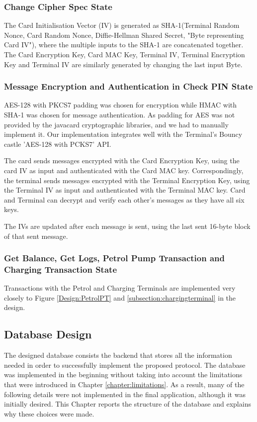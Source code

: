 \documentclass[a4paper,10pt]{llncs}
\begin{document}
\subsubsection{Change Cipher Spec State}
The Card Initialisation Vector (IV) is generated as SHA-1(Terminal Random Nonce, Card Random Nonce, Diffie-Hellman Shared Secret, "Byte representing Card IV"), where the multiple inputs to the SHA-1 are concatenated together. The Card Encryption Key, Card MAC Key, Terminal IV, Terminal Encryption Key and Terminal IV are similarly generated by changing the last input Byte.

\subsubsection{Message Encryption and Authentication in Check PIN State}
AES-128 with PKCS7 padding was chosen for encryption while HMAC with SHA-1 was chosen for message authentication. As padding for AES was not provided by the javacard cryptographic libraries, and we had to manually implement it. Our implementation integrates well with the Terminal's Bouncy castle 'AES-128 with PCKS7' API.

The card sends messages encrypted with the Card Encryption Key, using the card IV as input and authenticated with the Card MAC key. Correspondingly, the terminal sends messages encrypted with the Terminal Encryption Key, using the Terminal IV as input and authenticated with the Terminal MAC key. Card and Terminal can decrypt and verify each other's messages as they have all six keys.

The IVs are updated after each message is sent, using the last sent 16-byte block of that sent message.

\subsubsection{Get Balance, Get Logs, Petrol Pump Transaction and Charging Transaction State}
Transactions with the Petrol and Charging Terminals are implemented very closely to Figure \ref{Design:PetrolPT} and \ref{subsection:chargingterminal} in the design.


\subsection{Database Design}

The designed database consists the backend that stores all the information needed in order to successfully implement the proposed 
protocol. The database was implemented in the beginning without taking into account the limitations that were introduced in 
Chapter \ref{chapter:limitations}. As a result, many of the following details were not implemented in the final application, 
although it was initially desired. This Chapter reports the structure of the database and explains why these choices were made.
\end{document}
